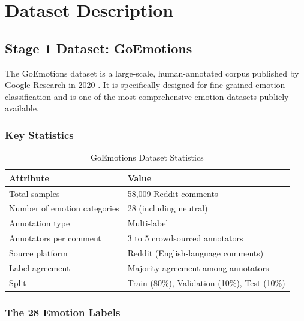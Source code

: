 \documentclass[12pt, a4paper]{report}
\begin{document}
\chapter{Dataset Description}

\section{Stage 1 Dataset: GoEmotions}

The GoEmotions dataset is a large-scale, human-annotated corpus published by Google Research in 2020 \cite{demszky2020goemotions}. It is specifically designed for fine-grained emotion classification and is one of the most comprehensive emotion datasets publicly available.

\subsection{Key Statistics}

\begin{table}[H]
    \centering
    \caption{GoEmotions Dataset Statistics}
    \label{tab:goemotions}
    \begin{tabular}{@{}ll@{}}
        \toprule
        \textbf{Attribute} & \textbf{Value} \\
        \midrule
        Total samples & 58,009 Reddit comments \\
        Number of emotion categories & 28 (including neutral) \\
        Annotation type & Multi-label \\
        Annotators per comment & 3 to 5 crowdsourced annotators \\
        Source platform & Reddit (English-language comments) \\
        Label agreement & Majority agreement among annotators \\
        Split & Train (80\%), Validation (10\%), Test (10\%) \\
        \bottomrule
    \end{tabular}
\end{table}

\subsection{The 28 Emotion Labels}
\end{document}
